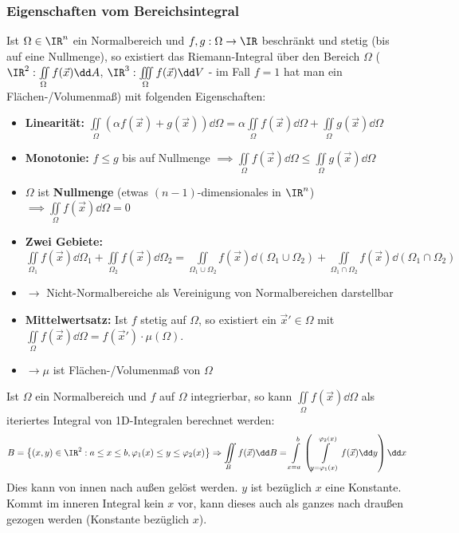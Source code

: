  \subsubsection{Eigenschaften vom Bereichsintegral}
 Ist $\Omega\in \IR^n$ ein Normalbereich und $f,g:\Omega\to \IR$ beschränkt und stetig (bis auf eine Nullmenge), so existiert das Riemann-Integral über den Bereich $\Omega$ ($\IR^2:\iint\limits_\Omega f(\vec{x})\dd A$, $\IR^3:\iiint\limits_\Omega f(\vec{x})\dd V$ - im Fall $f=1$ hat man ein Flächen-/Volumenmaß) mit folgenden Eigenschaften:
 \begin{itemize}
 	\item \textbf{Linearität: }$\iint\limits_\Omega\left(\alpha f(\vec{x}) +g(\vec{x})\right)\dd \Omega=\alpha\iint\limits_\Omega f(\vec{x})\dd \Omega+ \iint\limits_\Omega g(\vec{x})\dd \Omega$
 	\item \textbf{Monotonie: } $f\leq g$ bis auf Nullmenge $\implies \iint\limits_\Omega f(\vec{x})\dd \Omega \leq \iint\limits_\Omega g(\vec{x})\dd \Omega$
 	\item $\Omega$ ist \textbf{Nullmenge} (etwas $(n-1)$-dimensionales in $\IR^n$) $\implies \iint\limits_\Omega f(\vec{x})\dd \Omega =0$ 
 	\item \textbf{Zwei Gebiete: } $\iint\limits_{\Omega_1} f(\vec{x})\dd \Omega_1+\iint\limits_{\Omega_2} f(\vec{x})\dd \Omega_2=\iint\limits_{\Omega_1 \cup \Omega_2} f(\vec{x})\dd (\Omega_1 \cup \Omega_2)+\iint\limits_{\Omega_1 \cap \Omega_2} f(\vec{x})\dd (\Omega_1 \cap \Omega_2)$
 	\item[] $\rightarrow$ Nicht-Normalbereiche als Vereinigung von Normalbereichen darstellbar
 	\item \textbf{Mittelwertsatz:} Ist $f$ stetig auf $\Omega$, so existiert ein $\vec{x}\prime\in\Omega$ mit $\iint\limits_\Omega f(\vec{x})\dd \Omega = f(\vec{x}\prime) \cdot \mu(\Omega)$. 
 	\item[] $\rightarrow\mu$ ist Flächen-/Volumenmaß von $\Omega$
 \end{itemize}
 Ist $\Omega$ ein Normalbereich und $f$ auf $\Omega$ integrierbar, so kann $\iint\limits_\Omega f(\vec{x})\dd \Omega$ als iteriertes Integral von 1D-Integralen berechnet werden:
 \begin{equation*}
 	B=\left\{(x,y)\in\IR^2:a\leq x\leq b, \varphi_1(x)\leq y \leq\varphi_2(x)\right\} \Rightarrow \iint\limits_B f(\vec{x})\dd B= \int\limits_{x=a}^b\left(\int\limits_{y=\varphi_1(x)}^{\varphi_2(x)}f(\vec{x})\dd y\right) \dd x
 \end{equation*}
 Dies kann von innen nach außen gelöst werden. $y$ ist bezüglich $x$ eine Konstante. Kommt im inneren Integral kein $x$ vor, kann dieses auch als ganzes nach draußen gezogen werden (Konstante bezüglich $x$).
